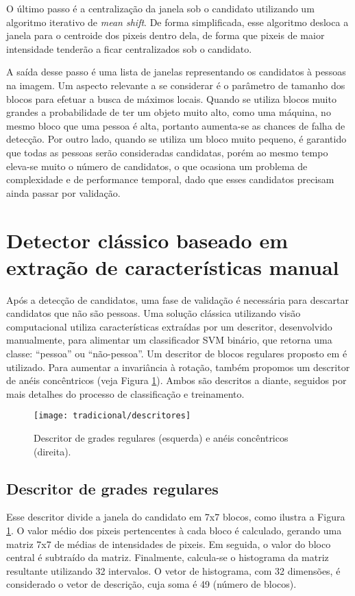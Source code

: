     O último passo é a centralização da janela sob o candidato utilizando um algoritmo iterativo de \textit{mean shift}. De forma simplificada, esse algoritmo desloca a janela para o centroide dos pixeis dentro dela, de forma que pixeis de maior intensidade tenderão a ficar centralizados sob o candidato.

    A saída desse passo é uma lista de janelas representando os candidatos à pessoas na imagem. Um aspecto relevante a se considerar é o parâmetro de tamanho dos blocos para efetuar a busca de máximos locais. Quando se utiliza blocos muito grandes a probabilidade de ter um objeto muito alto, como uma máquina, no mesmo bloco que uma pessoa é alta, portanto aumenta-se as chances de falha de detecção. Por outro lado, quando se utiliza um bloco muito pequeno, é garantido que todas as pessoas serão consideradas candidatas, porém ao mesmo tempo eleva-se muito o número de candidatos, o que ocasiona um problema de complexidade e de performance temporal, dado que esses candidatos precisam ainda passar por validação.

\section{Detector clássico baseado em extração de características manual}
\label{sec:classical}

    Após a detecção de candidatos, uma fase de validação é necessária para descartar candidatos que não são pessoas. Uma solução clássica utilizando visão computacional \cite{rauter} utiliza características extraídas por um descritor, desenvolvido manualmente, para alimentar um classificador SVM binário, que retorna uma classe: ``pessoa'' ou ``não-pessoa''. Um descritor de blocos regulares proposto em \cite{rauter} é utilizado. Para aumentar a invariância à rotação, também propomos um descritor de anéis concêntricos (veja Figura \ref{fig:descriptors}). Ambos são descritos a diante, seguidos por mais detalhes do processo de classificação e treinamento.

    \begin{figure}
    \centering
    \texttt{[image: tradicional/descritores]}
    \caption{Descritor de grades regulares (esquerda) e anéis concêntricos (direita).}
    \label{fig:descriptors}
    \end{figure}

    \subsection{Descritor de grades regulares}
      Esse descritor divide a janela do candidato em 7x7 blocos, como ilustra a Figura \ref{fig:descriptors}. O valor médio dos pixeis pertencentes à cada bloco é calculado, gerando uma matriz 7x7 de médias de intensidades de pixeis. Em seguida, o valor do bloco central é subtraído da matriz. Finalmente, calcula-se o histograma da matriz resultante utilizando 32 intervalos. O vetor de histograma, com 32 dimensões, é considerado o vetor de descrição, cuja soma é 49 (número de blocos).

